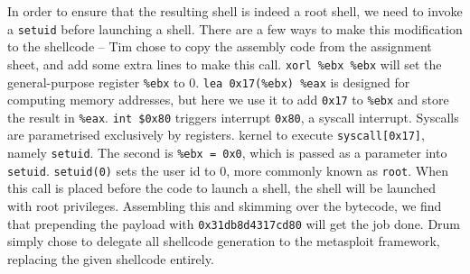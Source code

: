 In order to ensure that the resulting shell is indeed a root shell, we need to invoke a {\tt setuid} before launching a
shell. There are a few ways to make this modification to the shellcode -- Tim chose to copy the assembly code from the
assignment sheet, and add some extra lines to make this call. {\tt xorl \%ebx \%ebx} will set the general-purpose
register {\tt \%ebx} to 0. {\tt lea 0x17(\%ebx) \%eax} is designed for computing memory addresses, but here we use it to
add {\tt 0x17} to {\tt \%ebx} and store the result in {\tt \%eax}. {\tt int \$0x80} triggers interrupt {\tt 0x80}, a
syscall interrupt. Syscalls are parametrised exclusively by registers. 
kernel to execute {\tt syscall[0x17]}, namely {\tt setuid}. The second is {\tt \%ebx = 0x0}, which is passed as a
parameter into {\tt setuid}. {\tt setuid(0)} sets the user id to 0, more commonly known as {\tt root}. When this call is
placed before the code to launch a shell, the shell will be launched with root privileges. Assembling this and skimming
over the bytecode, we find that prepending the payload with {\tt 0x31db8d4317cd80} will get the job done. Drum simply
chose to delegate all shellcode generation to the metasploit framework, replacing the given shellcode entirely.